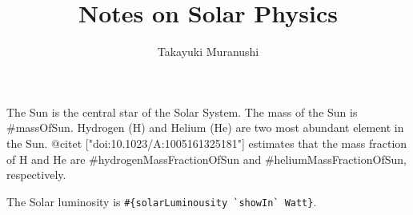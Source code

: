 \documentclass{article}
\title{Notes on Solar Physics}
\author{Takayuki Muranushi}
\begin{document}
\maketitle

The Sun is the central star of the Solar System.
The mass of the Sun is #{massOfSun}. 
Hydrogen (H) and Helium (He) are two most abundant element in the Sun.
@{citet ["doi:10.1023/A:1005161325181"]} estimates that the mass fraction of H and He are
#{hydrogenMassFractionOfSun} and
#{heliumMassFractionOfSun}, respectively.

The Solar luminosity is \verb!#{solarLuminousity `showIn` Watt}!.






\end{document}
